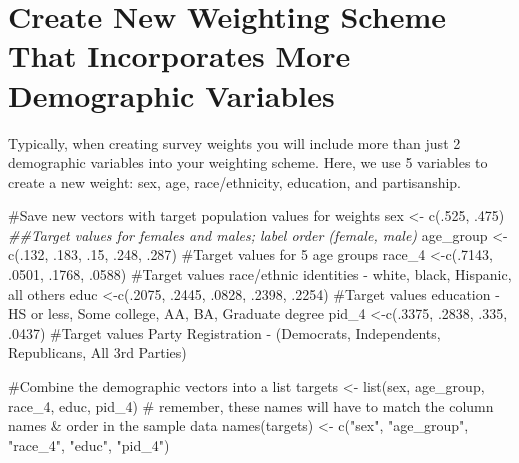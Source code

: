\documentclass[
  letterpaper,
  DIV=11,
  numbers=noendperiod]{scrreprt}
\newenvironment{Shaded}{\begin{snugshade}}{\end{snugshade}}
\newcommand{\CommentTok}[1]{\textcolor[rgb]{0.37,0.37,0.37}{#1}}
\newcommand{\DecValTok}[1]{\textcolor[rgb]{0.68,0.00,0.00}{#1}}
\newcommand{\DocumentationTok}[1]{\textcolor[rgb]{0.37,0.37,0.37}{\textit{#1}}}
\newcommand{\FunctionTok}[1]{\textcolor[rgb]{0.28,0.35,0.67}{#1}}
\newcommand{\NormalTok}[1]{\textcolor[rgb]{0.00,0.23,0.31}{#1}}
\newcommand{\OtherTok}[1]{\textcolor[rgb]{0.00,0.23,0.31}{#1}}
\newcommand{\StringTok}[1]{\textcolor[rgb]{0.13,0.47,0.30}{#1}}
\begin{document}
\hypertarget{create-new-weighting-scheme-that-incorporates-more-demographic-variables}{%
\section{Create New Weighting Scheme That Incorporates More Demographic
Variables}\label{create-new-weighting-scheme-that-incorporates-more-demographic-variables}}

Typically, when creating survey weights you will include more than just
2 demographic variables into your weighting scheme. Here, we use 5
variables to create a new weight: sex, age, race/ethnicity, education,
and partisanship.

\begin{Shaded}
\begin{Highlighting}[]
\CommentTok{\#Save new vectors with target population values for weights }
\NormalTok{sex }\OtherTok{\textless{}{-}} \FunctionTok{c}\NormalTok{(.}\DecValTok{525}\NormalTok{, .}\DecValTok{475}\NormalTok{)  }\DocumentationTok{\#\#Target values for females and males; label order (female, male)}
\NormalTok{age\_group  }\OtherTok{\textless{}{-}} \FunctionTok{c}\NormalTok{(.}\DecValTok{132}\NormalTok{, .}\DecValTok{183}\NormalTok{, .}\DecValTok{15}\NormalTok{, .}\DecValTok{248}\NormalTok{, .}\DecValTok{287}\NormalTok{)   }\CommentTok{\#Target values for 5 age groups }
\NormalTok{race\_4 }\OtherTok{\textless{}{-}}\FunctionTok{c}\NormalTok{(.}\DecValTok{7143}\NormalTok{, .}\DecValTok{0501}\NormalTok{, .}\DecValTok{1768}\NormalTok{, .}\DecValTok{0588}\NormalTok{) }\CommentTok{\#Target values race/ethnic identities {-} white, black, Hispanic, all others}
\NormalTok{educ }\OtherTok{\textless{}{-}}\FunctionTok{c}\NormalTok{(.}\DecValTok{2075}\NormalTok{, .}\DecValTok{2445}\NormalTok{, .}\DecValTok{0828}\NormalTok{, .}\DecValTok{2398}\NormalTok{, .}\DecValTok{2254}\NormalTok{) }\CommentTok{\#Target values education {-} HS or less, Some college, AA, BA, Graduate degree}
\NormalTok{pid\_4 }\OtherTok{\textless{}{-}}\FunctionTok{c}\NormalTok{(.}\DecValTok{3375}\NormalTok{, .}\DecValTok{2838}\NormalTok{, .}\DecValTok{335}\NormalTok{, .}\DecValTok{0437}\NormalTok{) }\CommentTok{\#Target values Party Registration {-} (Democrats, Independents, Republicans, All 3rd Parties)  }

\CommentTok{\#Combine the demographic vectors into a list}
\NormalTok{targets }\OtherTok{\textless{}{-}} \FunctionTok{list}\NormalTok{(sex, age\_group, race\_4, educ, pid\_4)}
\CommentTok{\# remember, these names will have to match the column names \& order in the sample data }
\FunctionTok{names}\NormalTok{(targets) }\OtherTok{\textless{}{-}} \FunctionTok{c}\NormalTok{(}\StringTok{"sex"}\NormalTok{, }\StringTok{"age\_group"}\NormalTok{, }\StringTok{"race\_4"}\NormalTok{, }\StringTok{"educ"}\NormalTok{, }\StringTok{"pid\_4"}\NormalTok{)}


\end{Highlighting}
\end{Shaded}
\end{document}
